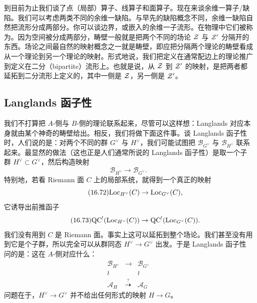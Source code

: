 到目前为止我们谈了点（局部）算子、线算子和面算子。现在来谈余维一算子/缺陷。我们可以考虑两类不同的余维一缺陷。与早先的缺陷概念不同，余维一缺陷自然把流形分成两部分。你可以谈边界，或嵌入的余维一子流形。在物理中它们被称为。因为空间被分成两部分，畴壁一般就是把两个不同的场论 $\mathcal{Z}$ 与 $\mathcal{Z}'$ 分隔开的东西。场论之间最自然的映射概念之一就是畴壁，即应把分隔两个理论的畴壁看成从一个理论到另一个理论的映射。形式地说，我们把定义在通常配边上的理论推广到定义在二分（bipartite）流形上。也就是说，从 $\mathcal{Z}$ 到 $\mathcal{Z}'$ 的映射，是把两者都延拓到二分流形上定义的，其中一侧是 $\mathcal{Z}$，另一侧是 $\mathcal{Z}'$。

\subsection{Langlands 函子性}

我们不打算把 $A$-侧与 $B$-侧的理论联系起来，尽管可以这样想：Langlands 对应本身就由某个神奇的畴壁给出。相反，我们将做下面这件事。谈 Langlands 函子性时，人们说的是：对两个不同的群 $G^\vee$ 与 $H^\vee$，我们可能试图把 $\mathcal{B}_{G^\vee}$ 与 $\mathcal{B}_{H^\vee}$ 联系起来。最显然的做法（这也正是人们通常所说的 Langlands 函子性）是取一个子群 $H^\vee\subset G^\vee$，然后构造映射
\begin{equation}\tag{16.71}
\mathcal{B}_{H^\vee}\to\mathcal{B}_{G^\vee}.
\end{equation}
特别地，若看 Riemann 面 $C$ 上的局部系统，就得到一个真正的映射
\begin{equation}\tag{16.72}
\mathrm{Loc}_{H^\vee}(C)\to\mathrm{Loc}_{G^\vee}(C),
\end{equation}
它诱导出前推函子
\begin{equation}\tag{16.73}
\mathrm{QC}^!(\mathrm{Loc}_{H^\vee}(C))\to\mathrm{QC}^!(\mathrm{Loc}_{G^\vee}(C)).
\end{equation}
我们没有用到 $C$ 是 Riemann 面。事实上这可以延拓到整个场论。我们甚至没有用到它是个子群，所以完全可以从群同态 $H^\vee\to G^\vee$ 出发。于是 Langlands 函子性问的是：这在 $A$-侧对应什么：
\begin{equation}\tag{16.74}
\begin{array}{ccc}
\mathcal{B}_{H^\vee} & \longrightarrow & \mathcal{B}_{G^\vee}\\[2pt]
\wr & & \wr\\[2pt]
\mathcal{A}_H & \stackrel{?}{\dashrightarrow} & \mathcal{A}_G
\end{array}
\end{equation}
问题在于，$H^\vee\to G^\vee$ 并不给出任何形式的映射 $H\to G$。


